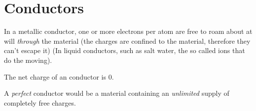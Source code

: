 \documentclass[oneside, 12pt, notitlepage]{book}
\begin{document}
\frontmatter
\mainmatter
\pagestyle{mynotespage} %

\chapter{Conductors}
In a metallic conductor, one or more electrons per atom are free to roam about at will \textit{through} the material (the charges are confined to the material, therefore they can't escape it) (In liquid conductors, such as salt water, the so called ions that do the moving). \par
The net charge of an conductor is $0$. \par
A \textit{perfect} conductor would be a material containing an \textit{unlimited} supply of completely free charges. \par
\end{document}

